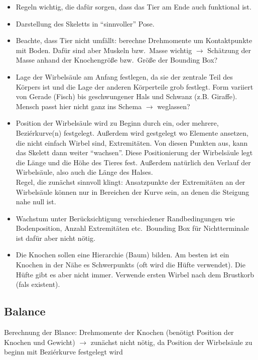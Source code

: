 \begin{itemize}
  \item Regeln wichtig, die dafür sorgen, dass das Tier am Ende auch funktional ist.
  \item Darstellung des Skeletts in "`sinnvoller"' Pose.
  \item Beachte, dass Tier nicht umfällt: berechne Drehmomente um Kontaktpunkte mit Boden. Dafür sind aber Muskeln bzw.\ Masse wichtig $\rightarrow$ Schätzung der Masse anhand der Knochengröße bzw.\ Größe der Bounding Box?
  
  \item Lage der Wirbelsäule am Anfang festlegen, da sie der zentrale Teil des Körpers ist und die Lage der anderen Körperteile grob festlegt. Form variiert von Gerade (Fisch) bis geschwungener Hals und Schwanz (z.B. Giraffe). Mensch passt hier nicht ganz ins Schema $\rightarrow$ weglassen?
  
  \item Position der Wirbelsäule wird zu Beginn durch ein, oder mehrere, Beziérkurve(n) festgelegt. Außerdem wird gestgelegt wo Elemente ansetzen, die nicht einfach Wirbel sind, \zb Extremitäten. Von diesen Punkten aus, kann das Skelett dann weiter "`wachsen"'. Diese Positionierung der Wirbelsäule legt die Länge und die Höhe des Tieres fest. Außerdem natürlich den Verlauf der Wirbelsäule, also \zb auch die Länge des Halses.\\
  Regel, die zunächst sinnvoll klingt: Ansatzpunkte der Extremitäten an der Wirbelsäule können nur in Bereichen der Kurve sein, an denen die Steigung nahe null ist.

  \item Wachstum unter Berücksichtigung verschiedener Randbedingungen wie Bodenposition, Anzahl Extremitäten etc.\ Bounding Box für Nichtterminale ist dafür aber nicht nötig.
  
  \item Die Knochen sollen eine Hierarchie (Baum) bilden. Am besten ist ein Knochen in der Nähe es Schwerpunkts (oft wird die Hüfte verwendet). Die Hüfte gibt es aber nicht immer. Verwende ersten Wirbel nach dem Brustkorb (fals existent).
\end{itemize}

\subsection{Balance} 

Berechnung der Blance: Drehmomente der Knochen (benötigt Position der Knochen und Gewicht) $\rightarrow$ zunächst nicht nötig, da Position  der Wirbelsäule zu beginn mit Beziérkurve festgelegt wird

